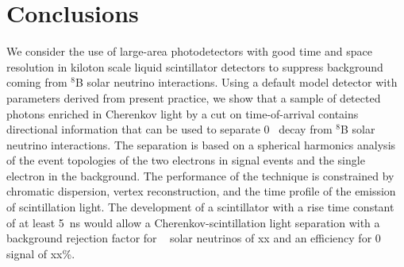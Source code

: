 \section{Conclusions}
\label{sec:conclusions}
We consider the use of large-area photodetectors with good time and
space resolution in kiloton scale liquid scintillator detectors to
suppress background coming from $^{8}$B solar neutrino
interactions. Using a default model detector with parameters derived
from present practice, we show that a sample of detected photons
enriched in Cherenkov light by a cut on time-of-arrival contains
directional information that can be used to separate 0{\nbb}~ decay from
$^{8}$B solar neutrino interactions. The separation is based on a
spherical harmonics analysis of the event topologies of the
two electrons in signal events and the single electron in the
background. The performance of the technique is constrained by
chromatic dispersion, vertex reconstruction, and the time profile of
the emission of scintillation light. The development of a scintillator
with a rise time constant of at least 5~ns would allow a
Cherenkov-scintillation light separation with a background rejection
factor for \B~ solar neutrinos of xx and an efficiency for 0\nbb~ signal
of xx\%.



